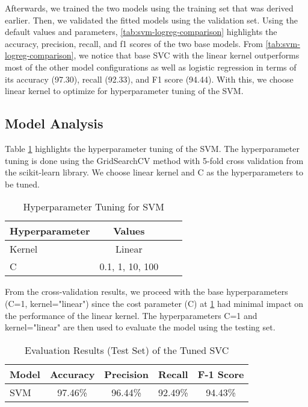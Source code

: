 \documentclass[conference]{IEEEtran}
\begin{document}
Afterwards, we trained the two models using the training set that was derived earlier. Then, we validated the fitted models using the validation set. Using the default values and parameters, \ref{tab:svm-logreg-comparison} highlights the accuracy, precision, recall, and f1 scores of the two base models. From \ref{tab:svm-logreg-comparison}, we notice that base SVC with the linear kernel outperforms most of the other model configurations as well as logistic regression in terms of its accuracy (97.30), recall (92.33), and F1 score (94.44). With this, we choose linear kernel to optimize for hyperparameter tuning of the SVM.

\subsection*{Model Analysis}

Table \ref{tab:hyperparameters} highlights the hyperparameter tuning of the SVM. The hyperparameter tuning is done using the GridSearchCV method with 5-fold cross validation from the scikit-learn library. We choose linear kernel and C as the hyperparameters to be tuned.

\begin{table}[htbp]
    \centering
    \caption{Hyperparameter Tuning for SVM}
    \label{tab:hyperparameters}
    \begin{tabular}{lccc}
      \toprule
      \textbf{Hyperparameter} & \textbf{Values} \\
      \midrule
      Kernel & Linear \\
      C & 0.1, 1, 10, 100 \\
      \bottomrule
    \end{tabular}
\end{table}

From the cross-validation results, we proceed with the base hyperparameters (C=1, kernel="linear") since the cost parameter (C) at \ref{tab:hyperparameters} had minimal impact on the performance of the linear kernel. The hyperparameters C=1 and kernel="linear" are then used to evaluate the model using the testing set.

\begin{table}[htbp]
    \centering
    \caption{Evaluation Results (Test Set) of the Tuned SVC}
    \label{tab:testset}
    \begin{tabular}{lcccc}
        \toprule
        \textbf{Model} & \textbf{Accuracy} & \textbf{Precision} & \textbf{Recall} & \textbf{F-1 Score}\\
        \midrule
        SVM & 97.46\% & 96.44\% & 92.49\% & 94.43\% \\
        \bottomrule
      \end{tabular}
\end{table}
\end{document}
